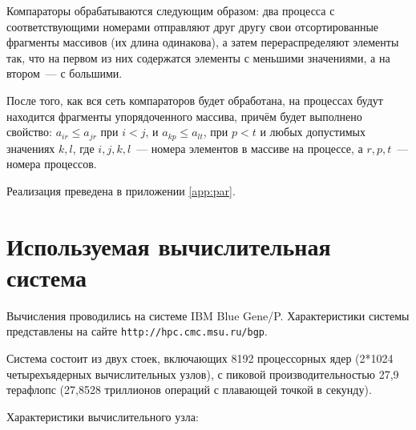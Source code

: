 \documentclass[oneside,final,14pt]{extreport}
\begin{document}
Компараторы обрабатываются следующим образом: два процесса с соответствующими
номерами отправляют друг другу свои отсортированные фрагменты массивов (их
длина одинакова), а затем перераспределяют элементы так, что на первом из
них содержатся элементы с меньшими значениями, а на втором~--- с большими.

После того, как вся сеть компараторов будет обработана, на процессах
будут находится фрагменты упорядоченного массива, причём будет выполнено
свойство: $a_{ir} \leq a_{jr}$ при $i < j$, и $a_{kp} \leq a_{lt}$, при
$p < t$ и любых допустимых значениях $k, l$, где $i, j, k, l$~--- номера
элементов в массиве на процессе, а $r, p, t$~--- номера процессов.

Реализация преведена в приложении \ref{app:par}.

\chapter*{Используемая вычислительная система}

Вычисления проводились на системе IBM Blue Gene/P.
Характеристики системы представлены на сайте \verb|http://hpc.cmc.msu.ru/bgp|.

Система состоит из двух стоек, включающих 8192 процессорных ядер
(2*1024 четырехъядерных вычислительных узлов), с пиковой производительностью
27,9 терафлопс (27,8528 триллионов операций с плавающей точкой в секунду).

Характеристики вычислительного узла:
\end{document}
